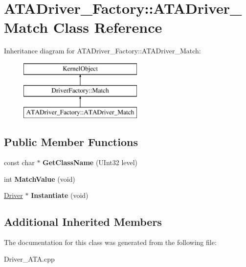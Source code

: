 \hypertarget{class_a_t_a_driver___factory_1_1_a_t_a_driver___match}{}\section{A\+T\+A\+Driver\+\_\+\+Factory\+:\+:A\+T\+A\+Driver\+\_\+\+Match Class Reference}
\label{class_a_t_a_driver___factory_1_1_a_t_a_driver___match}
Inheritance diagram for A\+T\+A\+Driver\+\_\+\+Factory\+:\+:A\+T\+A\+Driver\+\_\+\+Match\+:\begin{figure}[H]
\begin{center}
\leavevmode
\includegraphics[height=3.000000cm]{class_a_t_a_driver___factory_1_1_a_t_a_driver___match}
\end{center}
\end{figure}
\subsection*{Public Member Functions}
\begin{DoxyCompactItemize}
\item 
\mbox{\label{class_a_t_a_driver___factory_1_1_a_t_a_driver___match_a251190ce93be8be0e2794951a829c41e}} 
const char $\ast$ {\bfseries Get\+Class\+Name} (U\+Int32 level)
\item 
\mbox{\label{class_a_t_a_driver___factory_1_1_a_t_a_driver___match_a3634f7fc7bd9ea0ecc224bdd51a56d6e}} 
int {\bfseries Match\+Value} (void)
\item 
\mbox{\label{class_a_t_a_driver___factory_1_1_a_t_a_driver___match_a08ad2215e232e682b2a2fef9bfbf7941}} 
\hyperlink{class_driver}{Driver} $\ast$ {\bfseries Instantiate} (void)
\end{DoxyCompactItemize}
\subsection*{Additional Inherited Members}


The documentation for this class was generated from the following file\+:\begin{DoxyCompactItemize}
\item 
Driver\+\_\+\+A\+T\+A.\+cpp\end{DoxyCompactItemize}
